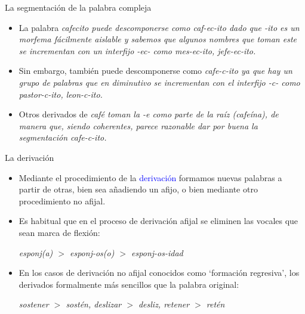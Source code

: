 \documentclass{beamer}
\begin{document}
\begin{frame}{La segmentación de la palabra compleja}
	
\begin{itemize}
	\item La palabra \it{cafecito} puede descomponerse como \it{caf-ec-ito} dado que \it{-ito} es un morfema fácilmente aislable y sabemos que algunos nombres que toman este se incrementan con un interfijo \it{-ec-} como \it{mes-ec-ito, jefe-ec-ito}.
	
	\item Sin embargo, también puede descomponerse como \it{cafe-c-ito} ya que hay un grupo de palabras que en diminutivo se incrementan con el interfijo \it{-c-} como \it{pastor-c-ito, leon-c-ito}.
	
	\item Otros derivados de \it{café} toman la \it{-e} como parte de la raíz (\it{cafeína}), de manera que, siendo coherentes, parece razonable dar por buena la segmentación \it{cafe-c-ito}.
\end{itemize}
\end{frame}

\begin{frame}{La derivación}

\begin{itemize}
	\item Mediante el procedimiento de la \textcolor{blue}{derivación} formamos nuevas palabras a partir de otras, bien sea añadiendo un afijo, o bien mediante otro procedimiento no afijal.
	\item Es habitual que en el proceso de derivación afijal se eliminen las vocales que sean marca de flexión:
	
	\it{esponj(a) $>$ esponj-os(o) $>$ esponj-os-idad} 
	
	\item En los casos de derivación no afijal conocidos como `formación regresiva', los derivados formalmente más sencillos que la palabra original:
	  
	\it{sostener $>$ sostén, deslizar $>$ desliz, retener $>$ retén} 
\end{itemize}

\end{frame}
\end{document}
